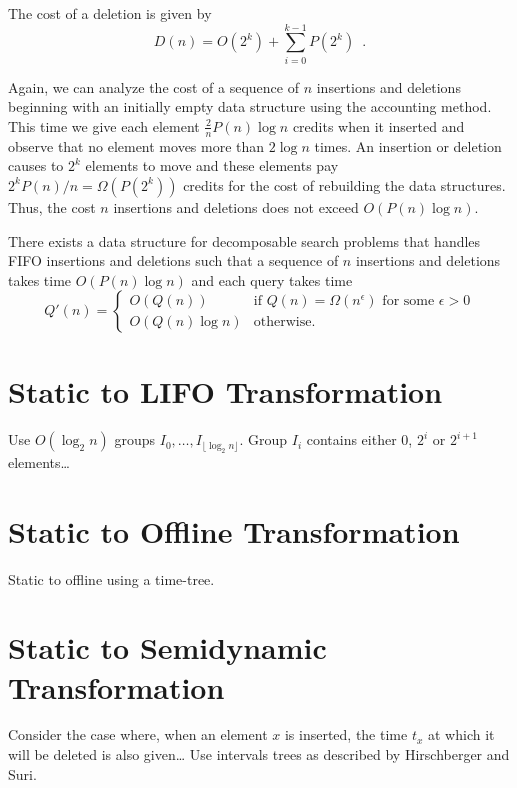 The cost of a deletion is given by
\[
  D(n) = O(2^k) + \sum_{i=0}^{k-1} P(2^k) \enspace .
\]

Again, we can analyze the cost of a sequence of $n$ insertions and
deletions beginning with an initially empty data structure using the
accounting method.  This time we give each element
$\frac{2}{n}P(n)\log n$ credits when it inserted and observe that no
element moves more than $2\log n$ times.  An insertion or deletion
causes to $2^k$ elements to move and these elements pay
$2^kP(n)/n=\Omega(P(2^k))$ credits for the cost of rebuilding the data
structures.  Thus, the cost $n$ insertions and deletions does not
exceed $O(P(n)\log n)$.

\begin{thm}
There exists a data structure for decomposable search problems that
handles FIFO insertions and deletions such that a sequence of $n$
insertions and deletions takes time $O(P(n)\log n)$ and each query
takes time 
\[
	Q'(n) 
	= \left\{\begin{array}{ll}
		O(Q(n)) & \mbox{if $Q(n)=\Omega(n^\epsilon)$ 
			for some $\epsilon>0$} \\
		O(Q(n)\log n) & \mbox{otherwise.} 
	\end{array}\right.
\]
\end{thm}

\section{Static to LIFO Transformation}

Use $O(\log_2 n)$ groups $I_0,\ldots,I_{\lfloor\log_2 n\rfloor}$.  Group
$I_i$ contains either $0$,  $2^{i}$ or $2^{i+1}$ elements\ldots


\section{Static to Offline Transformation}

Static to offline using a time-tree.

\section{Static to Semidynamic Transformation}

Consider the case where, when an element $x$ is inserted, the time
$t_x$ at which it will be deleted is also given\ldots
Use intervals trees as described by Hirschberger and Suri.

